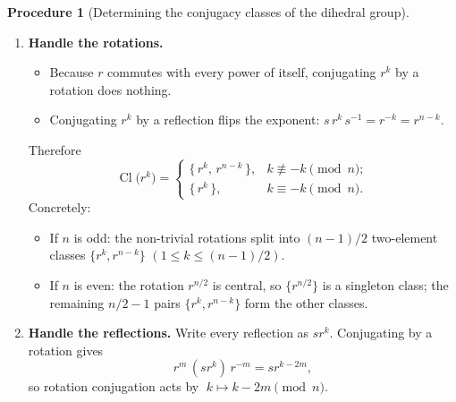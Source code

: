 \documentclass[12pt]{article}
\DeclareMathOperator{\Cl}{Cl}
\theoremstyle{definition} %
\newtheorem{procedure}{Procedure}
\theoremstyle{plain} %
\begin{document}
\begin{procedure}[Determining the conjugacy classes of the dihedral group]
\begin{enumerate}[label=\textbf{Step \arabic*.},leftmargin=2.8em]
      \item \textbf{Handle the rotations.}
            \begin{itemize}
               \item Because \(r\) commutes with every
                     power of itself, conjugating \(r^{k}\) by a rotation
                     does nothing.
               \item Conjugating \(r^{k}\) by a reflection flips the
                     exponent:
                     \(
                       s\,r^{k}\,s^{-1}=r^{-k}=r^{n-k}.
                     \)
            \end{itemize}
            Therefore
            \[
               \Cl\bigl(r^{k}\bigr)=
               \begin{cases}
                  \{\,r^{k},\,r^{n-k}\,\},
                     & k\not\equiv -k\pmod{n};\\[4pt]
                  \{\,r^{k}\,\}, & k\equiv -k\pmod{n}.
               \end{cases}
            \]
            Concretely:
            \begin{itemize}
               \item If \(n\) is odd:
                     the non-trivial rotations split into
                     \((n-1)/2\) two-element classes
                     \(\{r^{k},r^{n-k}\}\) \((1\le k\le (n-1)/2)\).
               \item If \(n\) is even:
                     the rotation \(r^{n/2}\) is central, so
                     \(\{r^{n/2}\}\) is a singleton class;
                     the remaining \(n/2-1\) pairs
                     \(\{r^{k},r^{n-k}\}\) form the other classes.
            \end{itemize}
      
      \item \textbf{Handle the reflections.}
            Write every reflection as \(s r^{k}\).
            Conjugating by a rotation gives
            \[
               r^{m}\,(s r^{k})\,r^{-m}=s r^{k-2m},
            \]
            so rotation conjugation acts by \(\;k\mapsto k-2m\pmod{n}\).
      

\end{enumerate}
\end{procedure}
\end{document}
